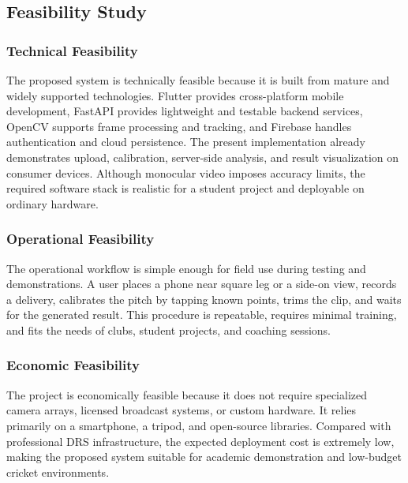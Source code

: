 \documentclass[12pt,a4paper]{article}
\begin{document}
\subsection{Feasibility Study}

\subsubsection{Technical Feasibility}

The proposed system is technically feasible because it is built from mature and widely supported technologies. Flutter provides cross-platform mobile development, FastAPI provides lightweight and testable backend services, OpenCV supports frame processing and tracking, and Firebase handles authentication and cloud persistence. The present implementation already demonstrates upload, calibration, server-side analysis, and result visualization on consumer devices. Although monocular video imposes accuracy limits, the required software stack is realistic for a student project and deployable on ordinary hardware.

\subsubsection{Operational Feasibility}

The operational workflow is simple enough for field use during testing and demonstrations. A user places a phone near square leg or a side-on view, records a delivery, calibrates the pitch by tapping known points, trims the clip, and waits for the generated result. This procedure is repeatable, requires minimal training, and fits the needs of clubs, student projects, and coaching sessions.

\subsubsection{Economic Feasibility}

The project is economically feasible because it does not require specialized camera arrays, licensed broadcast systems, or custom hardware. It relies primarily on a smartphone, a tripod, and open-source libraries. Compared with professional DRS infrastructure, the expected deployment cost is extremely low, making the proposed system suitable for academic demonstration and low-budget cricket environments.
\end{document}
